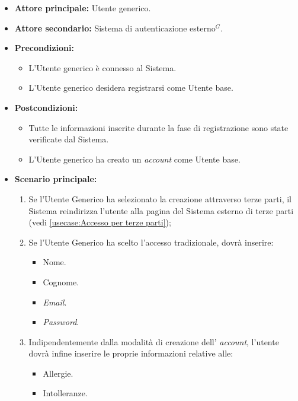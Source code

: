 \label{usecase:Registrazione Utente base}
\begin{itemize}

	\item \textbf{Attore principale:} Utente generico.
	\item \textbf{Attore secondario:} Sistema di autenticazione esterno$^G$.

	\item \textbf{Precondizioni:} 
	\begin{itemize}
        \item  L'Utente generico è connesso al Sistema.
        \item  L'Utente generico desidera registrarsi come Utente base.
    \end{itemize}
    
	\item \textbf{Postcondizioni:} 
    \begin{itemize}
        \item  Tutte le informazioni inserite durante la fase di registrazione sono state verificate dal Sistema.
        \item  L'Utente generico ha creato un \textit{account} come Utente base.
    \end{itemize}

	\item \textbf{Scenario principale:}
	\begin{enumerate}

            \item Se l'Utente Generico ha selezionato la creazione attraverso terze parti, il Sistema reindirizza l'utente alla pagina del Sistema esterno di terze parti (vedi \autoref{usecase:Accesso per terze parti});
            \item Se l'Utente Generico ha scelto l'accesso tradizionale, dovrà inserire:
            \begin{itemize}
                \item Nome.
                \item Cognome.
                \item \textit{Email}.
                \item \textit{Password}.
            \end{itemize}
            \item Indipendentemente dalla modalità di creazione dell' \textit{account}, l'utente dovrà infine inserire le proprie informazioni relative alle:
            \begin{itemize}
                \item Allergie.
                \item Intolleranze.
            \end{itemize} 
	\end{enumerate}
\end{itemize}

